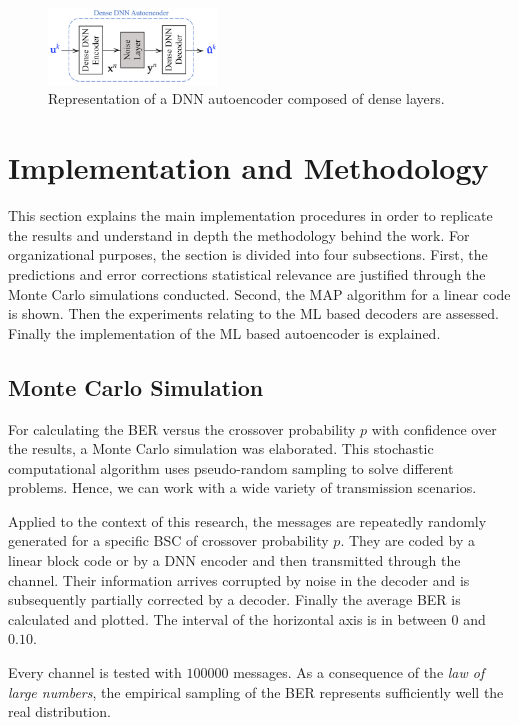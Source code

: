 \documentclass[conference]{IEEEtran}
\begin{document}
\begin{figure}[!ht]
  \centering
    \includegraphics[width=0.4\textwidth]{images/DNN_autoencoder}
    \caption{Representation of a DNN autoencoder composed of dense layers.}\label{fig:DDNNAutoencoder}
\end{figure}



\section{Implementation and Methodology}
This section explains the main implementation procedures in order to replicate the results and understand in depth the methodology behind the work. For organizational purposes, the section is divided into four subsections. First, the predictions and error corrections statistical relevance are justified through the Monte Carlo simulations conducted. Second, the MAP algorithm for a linear code is shown. Then the experiments relating to the ML based decoders are assessed. Finally the implementation of the ML based autoencoder is explained. 

\subsection{Monte Carlo Simulation}

For calculating the BER versus the crossover probability $p$ with confidence over the results, a Monte Carlo simulation was elaborated. This stochastic computational algorithm uses pseudo-random sampling to solve different problems. Hence, we can work with a wide variety of transmission scenarios.

Applied to the context of this research, the messages are repeatedly randomly generated for a specific BSC of crossover probability $p$. They are coded by a linear block code or by a DNN encoder and then transmitted through the channel. Their information arrives corrupted by noise in the decoder and is subsequently partially corrected by a decoder. Finally the average BER is calculated and plotted. The interval of the horizontal axis is in between $0$ and $0.10$.

Every channel is tested with $100000$ messages. As a consequence of the \textit{law of large numbers}, the empirical sampling of the BER represents sufficiently well the real distribution. 
\end{document}
